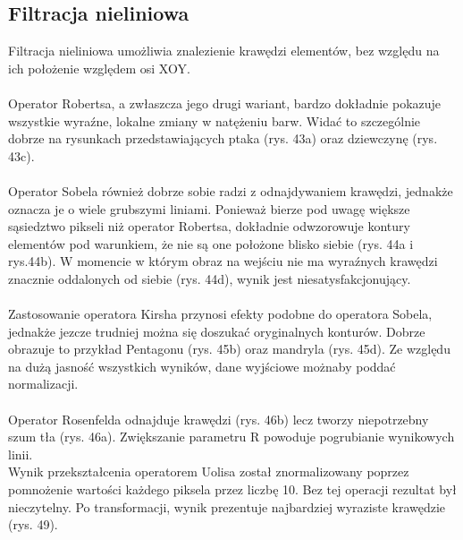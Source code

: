 \documentclass{classrep}
\begin{document}
\subsection{Filtracja nieliniowa}
Filtracja nieliniowa umożliwia znalezienie krawędzi elementów, bez względu na ich położenie względem osi XOY.\\
\\
\indent
Operator Robertsa, a zwłaszcza jego drugi wariant, bardzo dokładnie pokazuje wszystkie wyraźne, lokalne zmiany w natężeniu barw. Widać to szczególnie dobrze na rysunkach przedstawiających ptaka (rys. 43a) oraz dziewczynę (rys. 43c).\\
\\
\indent
Operator Sobela również dobrze sobie radzi z odnajdywaniem krawędzi, jednakże oznacza je o wiele grubszymi liniami. Ponieważ bierze pod uwagę większe sąsiedztwo pikseli niż operator Robertsa, dokładnie odwzorowuje kontury elementów pod warunkiem, że nie są one położone blisko siebie (rys. 44a i rys.44b). W momencie w którym obraz na wejściu nie ma wyraźnych krawędzi znacznie oddalonych od siebie (rys. 44d), wynik jest niesatysfakcjonujący.\\
\\
\indent
Zastosowanie operatora Kirsha przynosi efekty podobne do operatora Sobela, jednakże jezcze trudniej można się doszukać oryginalnych konturów. Dobrze obrazuje to przykład Pentagonu (rys. 45b) oraz mandryla (rys. 45d). Ze względu na dużą jasność wszystkich wyników, dane wyjściowe możnaby poddać normalizacji.\\
\\
\indent
Operator Rosenfelda odnajduje krawędzi (rys. 46b) lecz tworzy niepotrzebny szum tła (rys. 46a). Zwiększanie parametru R powoduje pogrubianie wynikowych linii. 
\\
\indent
Wynik przekształcenia operatorem Uolisa został znormalizowany poprzez pomnożenie wartości każdego piksela przez liczbę 10. Bez tej operacji rezultat był nieczytelny. Po transformacji, wynik prezentuje najbardziej wyraziste krawędzie (rys. 49).
\end{document}
